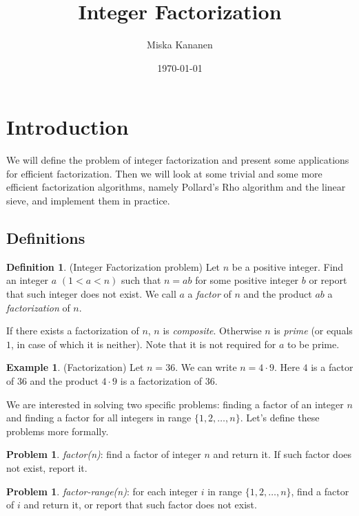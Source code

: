 \documentclass[12pt] {article}
\theoremstyle{plain}
\theoremstyle{definition}
\newtheorem{defn}[thm]{Definition}
\newtheorem{exmp}[thm]{Example}
\newtheorem{prob}[thm]{Problem}
\begin{document}
\title {Integer Factorization}
\author {Miska Kananen}
\date {\today}
\maketitle

\tableofcontents

\section {Introduction}

We will define the problem of integer factorization and present some applications for efficient factorization. Then we will look at some trivial and some more efficient factorization algorithms, namely Pollard's Rho algorithm and the linear sieve, and implement them in practice.

\subsection {Definitions}

\begin{defn} (Integer Factorization problem)
Let $n$ be a positive integer. Find an integer $a$ $(1 < a < n)$ such that $n = ab$ for some positive integer $b$ or report that such integer does not exist. We call $a$ a \textit{factor} of $n$ and the product $ab$ a \textit{factorization} of $n$.
\end{defn}

If there exists a factorization of $n$, $n$ is \textit{composite}. Otherwise $n$ is \textit{prime} (or equals $1$, in case of which it is neither). Note that it is not required for $a$ to be prime. 

\begin{exmp} (Factorization)
Let $n = 36$. We can write $n = 4 \cdot 9$. Here $4$ is a factor of $36$ and the product $4 \cdot 9$ is a factorization of $36$.
\end{exmp}

We are interested in solving two specific problems: finding a factor of an integer $n$ and finding a factor for all integers in range $\{1, 2, \dots, n\}$. Let's define these problems more formally.

\begin{prob}
\textit{factor(n)}: find a factor of integer $n$ and return it. If such factor does not exist, report it.
\end{prob}

\begin{prob}
\textit{factor-range(n)}: for each integer $i$ in range $\{1, 2, \dots, n\}$, find a factor of $i$ and return it, or report that such factor does not exist.
\end{prob}
\end{document}
